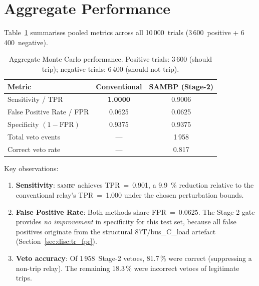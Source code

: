 \documentclass[12pt,a4paper]{article}
\newcommand{\SAMBP}{\textsc{sambp}}
\begin{document}
\section{Aggregate Performance}

Table~\ref{tab:aggregate} summarises pooled metrics across all
10\,000~trials (3\,600~positive + 6\,400~negative).

\begin{table}[ht]
\centering
\caption{Aggregate Monte Carlo performance.
  Positive trials: 3\,600 (should trip);
  negative trials: 6\,400 (should not trip).}
\label{tab:aggregate}
\begin{tabular}{lcc}
\toprule
Metric & Conventional & SAMBP (Stage-2) \\
\midrule
Sensitivity / TPR          & \textbf{1.0000} & 0.9006 \\
False Positive Rate / FPR  & 0.0625          & 0.0625 \\
Specificity $(1-\mathrm{FPR})$ & 0.9375      & 0.9375 \\
\midrule
Total veto events          & ---             & 1\,958 \\
Correct veto rate          & ---             & 0.817  \\
\bottomrule
\end{tabular}
\end{table}

\noindent Key observations:
\begin{enumerate}
  \item \textbf{Sensitivity}: \SAMBP{} achieves TPR~=~0.901, a
    \SI{9.9}{\percent} reduction relative to the conventional relay's
    TPR~=~1.000 under the chosen perturbation bounds.

  \item \textbf{False Positive Rate}: Both methods share FPR~=~0.0625.
    The Stage-2 gate provides \emph{no improvement} in specificity for
    this test set, because all false positives originate from the
    structural 87T/bus\_C\_load artefact (Section~\ref{sec:disc:tr_fpr}).

  \item \textbf{Veto accuracy}: Of 1\,958~Stage-2 vetoes, 81.7\,\% were
    correct (suppressing a non-trip relay).  The remaining 18.3\,\% were
    incorrect vetoes of legitimate trips.

\end{enumerate}
\end{document}
